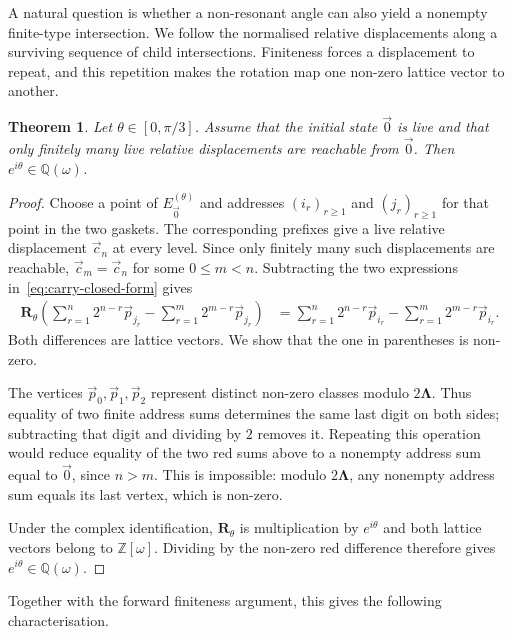 \documentclass[scheme=plain]{ctexart}
\newtheorem{theorem}{Theorem}[section]
\begin{document}
A natural question is whether a non-resonant angle can also yield a nonempty finite-type intersection.
We follow the normalised relative displacements along a surviving sequence of child intersections.
Finiteness forces a displacement to repeat, and this repetition makes the rotation map one non-zero lattice vector to another.

\begin{theorem}
\label{thm:finite-type-implies-commensurable}
Let $\theta\in[0,\pi/3]$.
Assume that the initial state $\vec{0}$ is live and that only finitely many live relative displacements are reachable from $\vec{0}$.
Then $e^{i\theta}\in\mathbb Q(\omega)$.
\end{theorem}

\begin{proof}
Choose a point of $E_{\vec{0}}^{(\theta)}$ and addresses $(i_r)_{r\ge1}$ and $(j_r)_{r\ge1}$ for that point in the two gaskets.
The corresponding prefixes give a live relative displacement $\vec c_n$ at every level.
Since only finitely many such displacements are reachable, $\vec c_m=\vec c_n$ for some $0\le m<n$.
Subtracting the two expressions in~\eqref{eq:carry-closed-form} gives
\[
\begin{aligned}
\mathbf R_\theta\left(
\sum_{r=1}^n2^{n-r}\vec p_{j_r}
-\sum_{r=1}^m2^{m-r}\vec p_{j_r}\right)
&=\sum_{r=1}^n2^{n-r}\vec p_{i_r}
-\sum_{r=1}^m2^{m-r}\vec p_{i_r}.
\end{aligned}
\]
Both differences are lattice vectors. We show that the one in parentheses is non-zero.

The vertices $\vec p_0,\vec p_1,\vec p_2$ represent distinct non-zero classes modulo $2\boldsymbol\Lambda$.
Thus equality of two finite address sums determines the same last digit on both sides; subtracting that digit and dividing by $2$ removes it.
Repeating this operation would reduce equality of the two red sums above to a nonempty address sum equal to $\vec{0}$, since $n>m$.
This is impossible: modulo $2\boldsymbol\Lambda$, any nonempty address sum equals its last vertex, which is non-zero.

Under the complex identification, $\mathbf R_\theta$ is multiplication by $e^{i\theta}$ and both lattice vectors belong to $\mathbb Z[\omega]$.
Dividing by the non-zero red difference therefore gives $e^{i\theta}\in\mathbb Q(\omega)$.
\end{proof}

Together with the forward finiteness argument, this gives the following characterisation.
\end{document}
